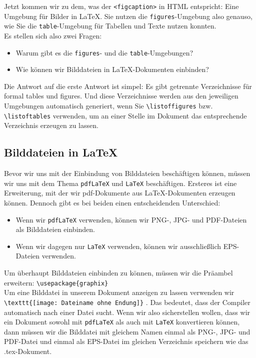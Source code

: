 Jetzt kommen wir zu dem, was der \verb|<figcaption>| in HTML entspricht: Eine Umgebung für Bilder in LaTeX. Sie nutzen die \verb|figures|-Umgebung also genauso, wie Sie die \verb|table|-Umgebung für Tabellen und Texte nutzen konnten.\\

Es stellen sich also zwei Fragen:

\begin{itemize}
	\item Warum gibt es die \verb|figures|- und die \verb|table|-Umgebungen?
	\item Wie können wir Bilddateien in LaTeX-Dokumenten einbinden?
\end{itemize}

Die Antwort auf die erste Antwort ist simpel: Es gibt getrennte Verzeichnisse für formal tables und figures. Und diese Verzeichnisse werden aus den jeweiligen Umgebungen automatisch generiert, wenn Sie \verb|\listoffigures| bzw. \verb|\listoftables| verwenden, um an einer Stelle im Dokument das entsprechende Verzeichnis erzeugen zu lassen.

\subsection{Bilddateien in LaTeX}

Bevor wir uns mit der Einbindung von Bilddateien beschäftigen können, müssen wir uns mit dem Thema \verb|pdfLaTeX| und \verb|LaTeX| beschäftigen. Ersteres ist eine Erweiterung, mit der wir pdf-Dokumente aus LaTeX-Dokumenten erzeugen können. Dennoch gibt es bei beiden einen entscheidenden Unterschied:

\begin{itemize}
	\item Wenn wir \verb|pdfLaTeX| verwenden, können wir PNG-, JPG- und PDF-Dateien als Bilddateien einbinden.
	\item Wenn wir dagegen \glqq{}nur\grqq{} \verb|LaTeX| verwenden, können wir ausschließlich EPS-Dateien verwenden.
\end{itemize}

Um überhaupt Bilddateien einbinden zu können, müssen wir die Präambel erweitern: \verb|\usepackage{graphix}|\\

Um eine Bilddatei in unserem Dokument anzeigen zu lassen verwenden wir \verb|\texttt{[image: Dateiname ohne Endung]}| . Das bedeutet, dass der Compiler automatisch nach einer Datei sucht. Wenn wir also sicherstellen wollen, dass wir ein Dokument sowohl mit \verb|pdfLaTeX| als auch mit \verb|LaTeX| konvertieren können, dann müssen wir die Bilddatei mit gleichem Namen einmal als PNG-, JPG- und PDF-Datei und einmal als EPS-Datei im gleichen Verzeichnis speichern wie das .tex-Dokument.\\


